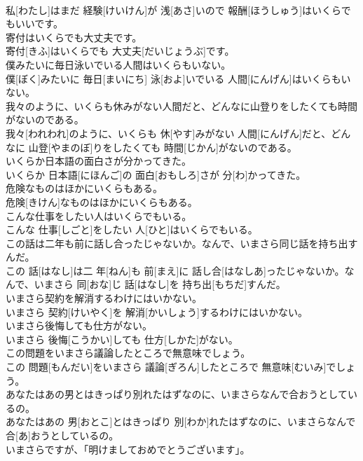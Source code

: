 \documentclass[8pt]{extreport}
\begin{document}
\begin{CJK}{UTF8}{min}
\\	私[わたし]はまだ 経験[けいけん]が 浅[あさ]いので 報酬[ほうしゅう]はいくらでもいいです。
\\	寄付はいくらでも大丈夫です。	
\\	寄付[きふ]はいくらでも 大丈夫[だいじょうぶ]です。
\\	僕みたいに毎日泳いでいる人間はいくらもいない。	
\\	僕[ぼく]みたいに 毎日[まいにち] 泳[およ]いでいる 人間[にんげん]はいくらもいない。
\\	我々のように、いくらも休みがない人間だと、どんなに山登りをしたくても時間がないのである。	
\\	我々[われわれ]のように、いくらも 休[やす]みがない 人間[にんげん]だと、どんなに 山登[やまのぼ]りをしたくても 時間[じかん]がないのである。
\\	いくらか日本語の面白さが分かってきた。	
\\	いくらか 日本語[にほんご]の 面白[おもしろ]さが 分[わ]かってきた。
\\	危険なものはほかにいくらもある。	
\\	危険[きけん]なものはほかにいくらもある。
\\	こんな仕事をしたい人はいくらでもいる。	
\\	こんな 仕事[しごと]をしたい 人[ひと]はいくらでもいる。
\\	この話は二年も前に話し合ったじゃないか。なんで、いまさら同じ話を持ち出すんだ。	
\\	この 話[はなし]は二 年[ねん]も 前[まえ]に 話し合[はなしあ]ったじゃないか。なんで、いまさら 同[おな]じ 話[はなし]を 持ち出[もちだ]すんだ。
\\	いまさら契約を解消するわけにはいかない。	
\\	いまさら 契約[けいやく]を 解消[かいしょう]するわけにはいかない。
\\	いまさら後悔しても仕方がない。	
\\	いまさら 後悔[こうかい]しても 仕方[しかた]がない。
\\	この問題をいまさら議論したところで無意味でしょう。	
\\	この 問題[もんだい]をいまさら 議論[ぎろん]したところで 無意味[むいみ]でしょう。
\\	あなたはあの男とはきっぱり別れたはずなのに、いまさらなんで合おうとしているの。	
\\	あなたはあの 男[おとこ]とはきっぱり 別[わか]れたはずなのに、いまさらなんで 合[あ]おうとしているの。
\\	いまさらですが、「明けましておめでとうございます」。	

\end{CJK}
\end{document}

